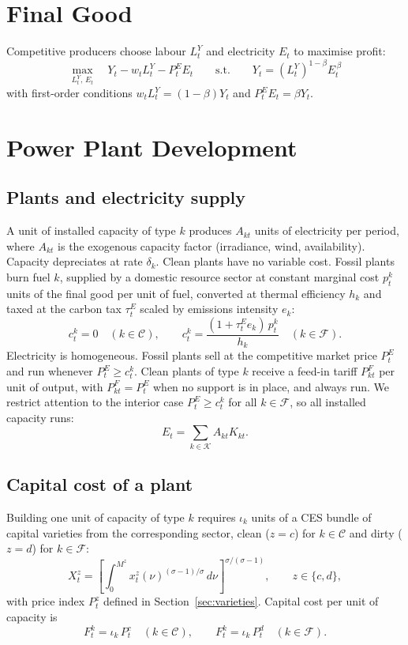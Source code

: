 \documentclass[12pt]{article}
\begin{document}
\section{Final Good}

Competitive producers choose labour $L^Y_t$ and electricity $E_t$ to
maximise profit:
\[
\max_{L^Y_t,\,E_t}\quad Y_t - w_tL^Y_t - P^E_tE_t
\qquad\text{s.t.}\qquad
Y_t = \left(L^Y_t\right)^{1-\beta}E_t^{\,\beta}
\]
with first-order conditions $w_tL^Y_t=(1-\beta)Y_t$ and
$P^E_tE_t=\beta Y_t$.

\section{Power Plant Development}\label{sec:dev}

\subsection{Plants and electricity supply}

A unit of installed capacity of type $k$ produces $A_{kt}$ units of
electricity per period, where $A_{kt}$ is the exogenous capacity factor
(irradiance, wind, availability). Capacity depreciates at rate
$\delta_k$. Clean plants have no variable cost. Fossil plants burn fuel
$k$, supplied by a domestic resource sector at constant marginal cost
$p^k_t$ units of the final good per unit of fuel, converted at thermal
efficiency $h_k$ and taxed at the carbon tax $\tau^E_t$ scaled by
emissions intensity $e_k$:
\[
c^k_t=0 \quad (k\in\mathcal C),
\qquad
c^k_t=\frac{(1+\tau^E_te_k)\,p^k_t}{h_k}
\quad (k\in\mathcal F).
\]
Electricity is homogeneous. Fossil plants sell at the competitive market
price $P^E_t$ and run whenever $P^E_t\ge c^k_t$. Clean plants of type
$k$ receive a feed-in tariff $P^F_{kt}$ per unit of output, with
$P^F_{kt}=P^E_t$ when no support is in place, and always run. We restrict
attention to the interior case $P^E_t\ge c^k_t$ for all
$k\in\mathcal F$, so all installed capacity runs:
\[
E_t=\sum_{k\in\mathcal K}A_{kt}K_{kt}.
\]

\subsection{Capital cost of a plant}

Building one unit of capacity of type $k$ requires $\iota_k$ units of a
CES bundle of capital varieties from the corresponding sector, clean
($z=c$) for $k\in\mathcal C$ and dirty ($z=d$) for $k\in\mathcal F$:
\[
X^z_t=\left[\int_0^{M^z}
x^z_t(\nu)^{(\sigma-1)/\sigma}\,d\nu\right]^{\sigma/(\sigma-1)},
\qquad z\in\{c,d\},
\]
with price index $P^z_t$ defined in Section~\ref{sec:varieties}.
Capital cost per unit of capacity is
\[
F^k_t=\iota_k\,P^c_t\quad(k\in\mathcal C),
\qquad
F^k_t=\iota_k\,P^d_t\quad(k\in\mathcal F).
\]
\end{document}
